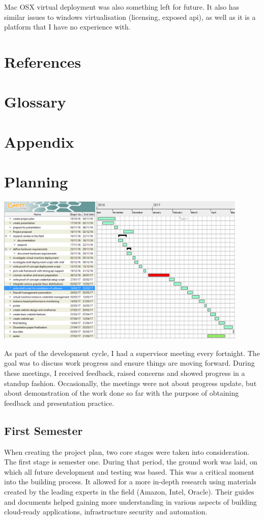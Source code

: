 \documentclass{article}
\begin{document}
Mac OSX virtual deployment was also something left for future. It also has similar issues to windows virtualisation (licensing, exposed \gls{api}), as well as it is a platform that I have no experience with.

\newpage
\section{References}


\renewcommand{\bibname}{}

\newpage
\section{Glossary}
\printglossary
\newpage
\section{Appendix}

\section{Planning}

\begin{center}
	\includegraphics[width=12cm]{gantt.jpg}
\end{center}

As part of the development cycle, I had a supervisor meeting every fortnight. The goal was to discuss work progress and ensure things are moving forward. During these meetings, I received feedback, raised concerns and showed progress in a \gls{standup} fashion. Occasionally, the meetings were not about progress update, but about demonstration of the work done so far with the purpose of obtaining feedback and presentation practice.

\subsection{First Semester}
When creating the project plan, two core stages were taken into consideration. The first stage is semester one. During that period, the ground work was laid, on which all future development and testing was based. This was a critical moment into the building process. It allowed for a more in-depth research using materials created by the leading experts in the field (Amazon, Intel, Oracle). Their guides and documents helped gaining more understanding in various aspects of building cloud-ready applications, infrastructure security and automation.
\end{document}
